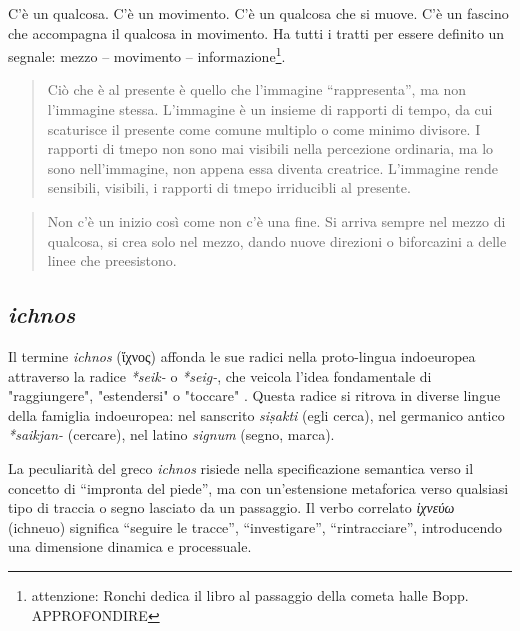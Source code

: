 C'è un qualcosa. C'è un movimento. C'è un qualcosa che si muove. C'è un fascino che accompagna il qualcosa in movimento. Ha tutti i tratti per essere definito un segnale: mezzo – movimento – informazione\footnote{attenzione: Ronchi dedica il libro al passaggio della cometa halle Bopp. APPROFONDIRE}.

\begin{quote}
\begin{sf}
\small
  Ciò che è al presente è quello che l'immagine “rappresenta”, ma non l'immagine
  stessa. L'immagine è un insieme di rapporti di tempo, da cui scaturisce il
  presente come comune multiplo o come minimo divisore. I rapporti di tmepo non
  sono mai visibili nella percezione ordinaria, ma lo sono nell'immagine, non
  appena essa diventa creatrice. L'immagine rende sensibili, visibili, i rapporti
  di tmepo irriducibli al presente.
  \cite{deleuze2009}
  \end{sf}
\end{quote}

\begin{quote}
\begin{sf}
\small
  Non c'è un inizio così come non c'è una fine. Si arriva sempre nel mezzo di
  qualcosa, si crea solo nel mezzo, dando nuove direzioni o biforcazini a delle
  linee che preesistono.
  \cite{deleuze2009}
  \end{sf}
\end{quote}


\subsection{\emph{ichnos}}

Il termine \textit{ichnos} (ἴχνος) affonda le sue radici nella proto-lingua indoeuropea attraverso la radice \textit{*seik-} o \textit{*seig-}, che veicola l'idea fondamentale di "raggiungere", "estendersi" o "toccare" \cite{chantraine1968}. Questa radice si ritrova in diverse lingue della famiglia indoeuropea: nel sanscrito \textit{siṣakti} (egli cerca), nel germanico antico \textit{*saikjan-} (cercare), nel latino \textit{signum} (segno, marca).

La peculiarità del greco \textit{ichnos} risiede nella specificazione semantica verso il concetto di “impronta del piede”, ma con un'estensione metaforica verso qualsiasi tipo di traccia o segno lasciato da un passaggio. Il verbo correlato \textit{ἰχνεύω} (ichneuo) significa “seguire le tracce”, “investigare”, “rintracciare”, introducendo una dimensione dinamica e processuale.

